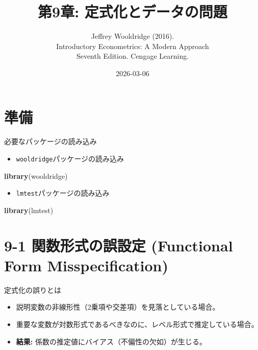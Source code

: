 \documentclass[
  ignorenonframetext,
]{beamer}
\title{第9章: 定式化とデータの問題}
\subtitle{Jeffrey Wooldridge (2016).\\
Introductory Econometrics: A Modern Approach\\
Seventh Edition. Cengage Learning.}
\author{}
\date{\vspace{-2.5em}2026-03-06}
\newenvironment{Shaded}{\begin{snugshade}}{\end{snugshade}}
\newcommand{\FunctionTok}[1]{\textcolor[rgb]{0.13,0.29,0.53}{\textbf{#1}}}
\newcommand{\NormalTok}[1]{#1}
\providecommand{\tightlist}{%
  \setlength{\itemsep}{0pt}\setlength{\parskip}{0pt}}
\begin{document}
\frame{\titlepage}

\section{準備}\label{ux6e96ux5099}

\begin{frame}[fragile]{必要なパッケージの読み込み}
\label{ux5fc5ux8981ux306aux30d1ux30c3ux30b1ux30fcux30b8ux306eux8aadux307fux8fbcux307f}
\begin{itemize}
\tightlist
\item
  \texttt{wooldridge}パッケージの読み込み
\end{itemize}

\begin{Shaded}
\begin{Highlighting}[]
\FunctionTok{library}\NormalTok{(wooldridge)}
\end{Highlighting}
\end{Shaded}

\begin{itemize}
\tightlist
\item
  \texttt{lmtest}パッケージの読み込み
\end{itemize}

\begin{Shaded}
\begin{Highlighting}[]
\FunctionTok{library}\NormalTok{(lmtest)}
\end{Highlighting}
\end{Shaded}
\end{frame}

\section{9-1 関数形式の誤設定 (Functional Form
Misspecification)}\label{ux95a2ux6570ux5f62ux5f0fux306eux8aa4ux8a2dux5b9a-functional-form-misspecification}

\begin{frame}{定式化の誤りとは}
\label{ux5b9aux5f0fux5316ux306eux8aa4ux308aux3068ux306f}
\begin{itemize}
\tightlist
\item
  説明変数の非線形性（2乗項や交差項）を見落としている場合。
\item
  重要な変数が対数形式であるべきなのに、レベル形式で推定している場合。
\item
  \textbf{結果:} 係数の推定値にバイアス（不偏性の欠如）が生じる。
\end{itemize}
\end{frame}
\end{document}
